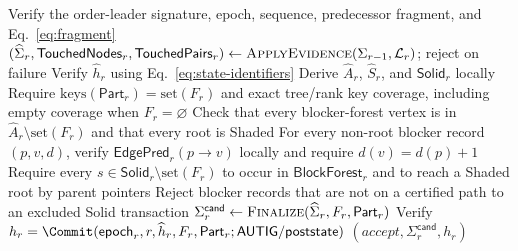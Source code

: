 \begin{algorithm}[h!]
\caption{\textsc{VerifyFragment}: Verify a Proof-Carrying Fragment}
\label{alg:verify-fragment}
\footnotesize
{}
Verify the order-leader signature, epoch, sequence, predecessor fragment,
and Eq.~\eqref{eq:fragment}\;
$(\widehat\Sigma_r,\mathsf{TouchedNodes}_r,
  \mathsf{TouchedPairs}_r)\gets
 \textsc{ApplyEvidence}(\Sigma_{r-1},\mathcal L_r)$; reject on failure\;
Verify $\widehat h_r$ using Eq.~\eqref{eq:state-identifiers}\;
Derive $\widehat A_r$, $\widehat S_r$, and $\mathsf{Solid}_r$ locally\;
Require $\mathrm{keys}(\mathsf{Part}_r)=\mathrm{set}(F_r)$ and exact
tree/rank key coverage, including empty coverage when $F_r=\varnothing$\;
Check that every blocker-forest vertex is in
$\widehat A_r\setminus\mathrm{set}(F_r)$ and that every root is Shaded\;
For every non-root blocker record $(p,v,d)$, verify
$\mathsf{EdgePred}_r(p\to v)$ locally and require
$d(v)=d(p)+1$\;
Require every $s\in\mathsf{Solid}_r\setminus\mathrm{set}(F_r)$ to occur in
$\mathsf{BlockForest}_r$ and to reach a Shaded root by parent pointers\;
Reject blocker records that are not on a certified path to an excluded Solid
transaction\;
$\Sigma_r^{\mathsf{cand}}\gets
  \textsc{Finalize}(\widehat\Sigma_r,F_r,\mathsf{Part}_r)$\;
Verify $h_r=\Commit(\mathsf{epoch}_r,r,\widehat h_r,F_r,\mathsf{Part}_r;
                    \mathsf{AUTIG/poststate})$\;
\KwRet $(accept,\Sigma_r^{\mathsf{cand}},h_r)$
\end{algorithm}

